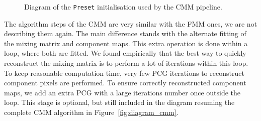 \documentclass[../../thesis.tex]{subfiles}
\begin{document}
\begin{figure}[htbp]
{%
}
\caption{Diagram of the \texttt{Preset} initialisation used by the CMM pipeline.
}
\label{fig:diagram_preset}
\end{figure}

The algorithm steps of the CMM are very similar with the FMM ones, we are not describing them again. The main difference stands with the alternate fitting of the mixing matrix and component maps. This extra operation is done within a loop, where both are fitted. 
We found empirically that the best way to quickly reconstruct the mixing matrix is to perform a lot of iterations within this loop. To keep reasonable computation time, very few PCG iterations to reconstruct component pixels are performed. To ensure  correctly reconstructed component maps, we add an extra PCG with a large iterations number once outside the loop. This stage is optional, but still included in the diagram resuming the complete CMM algorithm in Figure~\ref{fig:diagram_cmm}. 
\end{document}
